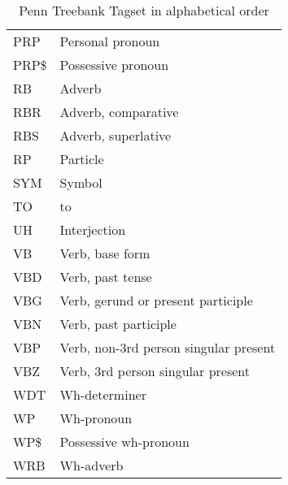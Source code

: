 \begin{table}
\begin{tabular}{|l|l|}
    PRP  & Personal pronoun                         \\
    PRP\$ & Possessive pronoun                       \\
    RB   & Adverb                                   \\
    RBR  & Adverb, comparative                      \\
    RBS  & Adverb, superlative                      \\
    RP   & Particle                                 \\
    SYM  & Symbol                                   \\
    TO   & to                                       \\
    UH   & Interjection                             \\
    VB   & Verb, base form                          \\
    VBD  & Verb, past tense                         \\
    VBG  & Verb, gerund or present participle       \\
    VBN  & Verb, past participle                    \\
    VBP  & Verb, non-3rd person singular present    \\
    VBZ  & Verb, 3rd person singular present        \\
    WDT  & Wh-determiner                            \\
    WP   & Wh-pronoun                               \\
    WP\$ & Possessive wh-pronoun                    \\
    WRB  & Wh-adverb                                \\ \hline
    \end{tabular}
    \caption{Penn Treebank Tagset in alphabetical order}
    \label{tab:penn}
\end{table}

